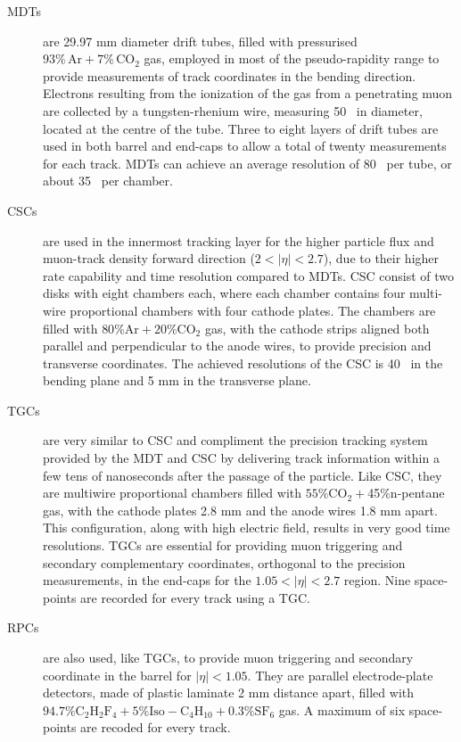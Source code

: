 	\begin{description}
	\item[\acp{MDT}] are 29.97 mm diameter drift tubes, filled with pressurised $93\%\,\mathrm{Ar}+7\%\,\mathrm{CO}_2$ gas, employed in most of the pseudo-rapidity range to provide measurements of track coordinates in the bending direction. Electrons resulting from the ionization of the gas from a penetrating muon are collected by a tungsten-rhenium wire, measuring 50 \mum\ in diameter, located at the centre of the tube.
	Three to eight layers of drift tubes are used in both barrel and end-caps to allow a total of twenty measurements for each track. \acp{MDT} can achieve an average resolution of 80 \mum\ per tube, or about 35 \mum\ per chamber.
	\item[\acp{CSC}] are used in the innermost tracking layer for the higher particle flux and muon-track density forward direction ($2<|\eta|<2.7$), due to their higher rate capability and time resolution compared to \acp{MDT}.
	\ac{CSC} consist of two disks with eight chambers each, where each chamber contains four multi-wire proportional chambers with four cathode plates. The chambers are filled with  $80\%\mathrm{Ar}+20\%\mathrm{CO}_2$ gas, with the cathode strips aligned both parallel and perpendicular to the anode wires, to provide precision and transverse coordinates. 
	The achieved resolutions of the \ac{CSC} is 40 \mum\ in the bending plane and 5 mm in the transverse plane. 
	\item[\acp{TGC}] are very similar to \ac{CSC} and compliment the precision tracking system provided by the \ac{MDT} and \ac{CSC} by delivering track information within a few tens of nanoseconds after the passage of the particle. 
	Like \ac{CSC}, they are multiwire proportional chambers filled with $55\%\mathrm{CO_2+}$45\%n-pentane gas, with the cathode plates 2.8 mm and the anode wires 1.8 mm apart. 
	This configuration, along with high electric field, results in very good time resolutions.
	\acp{TGC} are essential for providing muon triggering and secondary complementary coordinates, orthogonal to the precision measurements, in the end-caps for the $1.05<|\eta|<2.7$ region. 
	Nine space-points are recorded for every track using a \ac{TGC}.
	\item[\acp{RPC}] are also used, like \acp{TGC}, to provide muon triggering and secondary coordinate in the barrel for $|\eta|<1.05$.
	They are parallel electrode-plate detectors, made of plastic laminate 2 mm distance apart, filled with $\mathrm{94.7\% C_2H_2F_4+5\% Iso-C_4H_{10}+0.3\% SF_6}$ gas. A maximum of six space-points are recoded for every track.
	\end{description}
